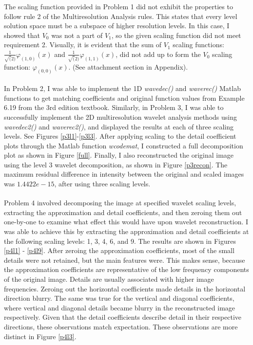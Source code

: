 \documentclass[./rarnold_report5.tex]{subfiles}
\begin{document}
\noindent The scaling function provided in Problem 1 did not exhibit the properties to follow rule 2 of the Multiresolution Analysis rules.  This states that every level solution space must be a subspace of higher resolution levels.  In this case, I showed that $V_{0}$ was not a part of $V_{1}$, so the given scaling function did not meet requirement 2.  Visually, it is evident that the sum of $V_{1}$ scaling functions: $\frac{1}{\sqrt(2)}\varphi_{(1,0)}(x)$ and $\frac{1}{\sqrt(2)}\varphi_{(1,1)}(x)$, did not add up to form the $V_{0}$ scaling function: $\varphi_{(0,0)}(x)$.  (See attachment section in Appendix). 
\\ \\
\noindent In Problem 2, I was able to implement the 1D \textit{wavedec()} and \textit{waverec()} Matlab functions to get matching coefficients and original function values from Example 6.19 from the 3rd edition textbook.  Similarly, in Problem 3, I was able to successfully implement the 2D multiresolution wavelet analysis methods using \textit{wavedec2()} and \textit{waverec2()}, and displayed the results at each of three scaling levels.  See Figures \ref{p3l1}-\ref{p3l3}.  After applying scaling to the detail coefficient plots through the Matlab function \textit{wcodemat}, I constructed a full decomposition plot as shown in Figure \ref{full}.  Finally, I also reconstructed the original image using the level 3 wavelet decomposition, as shown in Figure \ref{p3recon}.  The maximum residual difference in intensity between the original and scaled images was $1.4422e-15$, after using three scaling levels.
\\ \\
\noindent Problem 4 involved decomposing the image at specified wavelet scaling levels, extracting the approximation and detail coefficients, and then zeroing them out one-by-one to examine what effect this would have upon wavelet reconstruction.  I was able to achieve this by extracting the approximation and detail coefficients at the following scaling levels: 1, 3, 4, 6, and 9.  The results are shown in Figures \ref{p4l1} - \ref{p4l9}.  After zeroing the approximation coefficients, most of the small details were not retained, but the main features were.  This makes sense, because the approximation coefficients are representative of the low frequency components of the original image.  Details are usually associated with higher image frequencies.  Zeroing out the horizontal coefficients made details in the horizontal direction blurry.  The same was true for the vertical and diagonal coefficients, where vertical and diagonal details became blurry in the reconstructed image respectively.  Given that the detail coefficients describe detail in their respective directions, these observations match expectation.  These observations are more distinct in Figure \ref{p4l3}.
\end{document}
